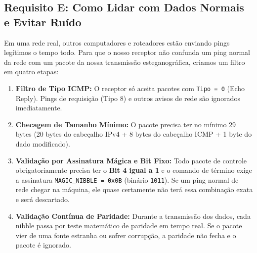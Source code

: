 \documentclass[12pt,a4paper]{article}
\begin{document}
\subsection{Requisito E: Como Lidar com Dados Normais e Evitar Ruído}
Em uma rede real, outros computadores e roteadores estão enviando pings legítimos o tempo todo. Para que o nosso receptor não confunda um ping normal da rede com um pacote da nossa transmissão esteganográfica, criamos um filtro em quatro etapas:

\begin{enumerate}[leftmargin=*]
    \item \textbf{Filtro de Tipo ICMP:} O receptor só aceita pacotes com \texttt{Tipo = 0} (Echo Reply). Pings de requisição (Tipo 8) e outros avisos de rede são ignorados imediatamente.
    \item \textbf{Checagem de Tamanho Mínimo:} O pacote precisa ter no mínimo 29 bytes (20 bytes do cabeçalho IPv4 + 8 bytes do cabeçalho ICMP + 1 byte do dado modificado).
    \item \textbf{Validação por Assinatura Mágica e Bit Fixo:} Todo pacote de controle obrigatoriamente precisa ter o \textbf{Bit 4 igual a 1} e o comando de término exige a assinatura \texttt{MAGIC\_NIBBLE = 0x0B} (binário \texttt{1011}). Se um ping normal de rede chegar na máquina, ele quase certamente não terá essa combinação exata e será descartado.
    \item \textbf{Validação Contínua de Paridade:} Durante a transmissão dos dados, cada nibble passa por teste matemático de paridade em tempo real. Se o pacote vier de uma fonte estranha ou sofrer corrupção, a paridade não fecha e o pacote é ignorado.
\end{enumerate}
\end{document}
